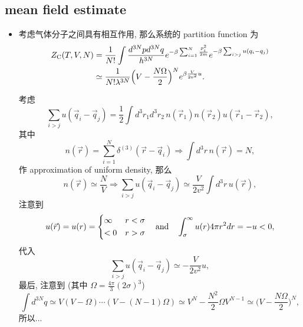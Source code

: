 \subsection{mean field estimate}
\begin{itemize}
	\item 考虑气体分子之间具有相互作用, 那么系统的 partition function 为
	\begin{align}
		Z_\text{C}(T, V, N) &= \frac{1}{N!} \int \frac{d^{3 N} p d^{3 N} q}{h^{3 N}} e^{- \beta \sum_{i = 1}^N \frac{p_i^2}{2 m}} e^{- \beta \sum_{i > j} u(q_i - q_j)} \notag \\
		&\simeq \frac{1}{N! \lambda^{3 N}} \Big( V - \frac{N \Omega}{2} \Big)^N e^{\beta \frac{V}{2 v^2} u}.
	\end{align}
	
	\begin{tcolorbox}[title=calculation:]
		考虑
		\begin{equation}
			\sum_{i > j} u(\vec{q}_i - \vec{q}_j) = \frac{1}{2} \int d^3 r_1 d^3 r_2 \, n(\vec{r}_1) n(\vec{r}_2) u(\vec{r}_1 - \vec{r}_2),
		\end{equation}
		其中
		\begin{equation}
			n(\vec{r}) = \sum_{i = 1}^N \delta^{(3)}(\vec{r} - \vec{q}_i) \Longrightarrow \int d^3 r \, n(\vec{r}) = N,
		\end{equation}
		作 approximation of uniform density, 那么
		\begin{equation}
			n(\vec{r}) \simeq \frac{N}{V} \Longrightarrow \sum_{i > j} u(\vec{q}_i - \vec{q}_j) \simeq \frac{V}{2 v^2} \int d^3 r \, u(\vec{r}),
		\end{equation}
		注意到
		\begin{equation}
			u(\vec{r}) = u(r) = \begin{dcases}
				\infty & r < \sigma \\
				< 0 & r > \sigma
			\end{dcases} \quad \text{and} \quad \int_\sigma^\infty u(r) 4 \pi r^2 dr = - u < 0,
		\end{equation}
		代入
		\begin{equation}
			\sum_{i > j} u(\vec{q}_i - \vec{q}_j) \simeq - \frac{V}{2 v^2} u,
		\end{equation}
		最后, 注意到 (其中 $\Omega = \frac{4 \pi}{3} (2 \sigma)^3$)
		\begin{equation}
			\int d^{3 N} q \simeq V (V - \Omega) \cdots (V - (N - 1) \Omega) \simeq V^N - \frac{N^2}{2} \Omega V^{N - 1} \simeq \Big( V - \frac{N \Omega}{2} \Big)^N,
		\end{equation}
		所以...
	\end{tcolorbox}
	

\end{itemize}
